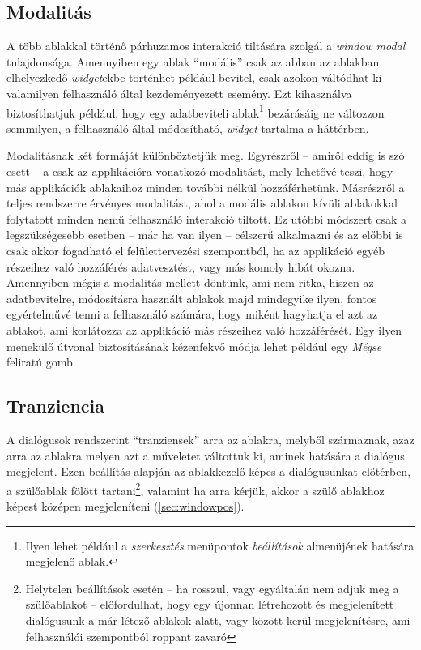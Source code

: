 \subsection{Modalitás}
\label{sec:windowmodal}

A több ablakkal történő párhuzamos interakció tiltására szolgál a \textit{window} \textit{modal} tulajdonsága. Amennyiben egy ablak ``modális'' csak az abban az ablakban elhelyezkedő \textit{widget}ekbe történhet például bevitel, csak azokon váltódhat ki valamilyen felhasználó által kezdeményezett esemény. Ezt kihasználva biztosíthatjuk például, hogy egy adatbeviteli ablak\footnote{Ilyen lehet például a \textit{szerkesztés} menüpontok \textit{beállítások} almenüjének hatására megjelenő ablak.} bezárásáig ne változzon semmilyen, a felhasználó által módosítható, \textit{widget} tartalma a háttérben.

Modalitásnak két formáját különböztetjük meg. Egyrészről -- amiről eddig is szó esett -- a csak az applikációra vonatkozó modalitást, mely lehetővé teszi, hogy más applikációk ablakaihoz minden további nélkül hozzáférhetünk. Másrészről a teljes rendszerre érvényes modalitást, ahol a modális ablakon kívüli ablakokkal folytatott minden nemű felhasználó interakció tiltott. Ez utóbbi módszert csak a legszükségesebb esetben -- már ha van ilyen -- célszerű alkalmazni és az előbbi is csak akkor fogadható el felülettervezési szempontból, ha az applikáció egyéb részeihez való hozzáférés adatvesztést, vagy más komoly hibát okozna. Amennyiben mégis a modalitás mellett döntünk, ami nem ritka, hiszen az adatbevitelre, módosításra használt ablakok majd mindegyike ilyen, fontos egyértelművé tenni a felhasználó számára, hogy miként hagyhatja el azt az ablakot, ami korlátozza az applikáció más részeihez való hozzáférését. Egy ilyen menekülő útvonal biztosításának kézenfekvő módja lehet például egy \textit{Mégse} feliratú gomb.

\subsection{Tranziencia}
\label{sec:windowtransientfor}

A dialógusok rendszerint ``tranziensek'' arra az ablakra, melyből származnak, azaz arra az ablakra melyen azt a műveletet váltottuk ki, aminek hatására a dialógus megjelent. Ezen beállítás alapján az ablakkezelő képes a dialógusunkat előtérben, a szülőablak fölött tartani\footnote{Helytelen beállítások esetén -- ha rosszul, vagy egyáltalán nem adjuk meg a szülőablakot -- előfordulhat, hogy egy újonnan létrehozott és megjelenített dialógusunk a már létező ablakok alatt, vagy között kerül megjelenítésre, ami felhasználói szempontból roppant zavaró}, valamint ha arra kérjük, akkor a szülő ablakhoz képest középen megjeleníteni (\ref{sec:windowpos}).

